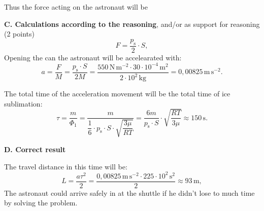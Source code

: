 Thus the force acting on the astronaut will be

\textbf{C. Calculations according to the reasoning}, and/or as support for
reasoning \hfill(2 points)
\[ F = \frac{p_{\mathrm{s}}}{2}\cdot S, \]
Opening the can the astronaut will be accelearated %
with:
\[ a = \frac{F}{M} = \frac{p_{\mathrm{s}}\cdot S}{2M}
   = \frac{550\,\mathrm{N\,m^{-2}} \cdot 30\cdot10^{-4}\,\mathrm{m^2}}
          {2\cdot10^{2}\,\mathrm{kg}}
   = 0{,}00825\,\mathrm{m\,s^{-2}}. \]

The total time of the acceleration movement will be the total time of ice
sublimation:
\[ \tau = \frac{m}{\Phi_1}
   = \frac{m}{\dfrac{1}{6}\cdot p_{\mathrm{s}}\cdot S
     \cdot\sqrt{\dfrac{3\mu}{RT}}}
   = \frac{6m}{p_{\mathrm{s}}\cdot S}\cdot\sqrt{\frac{RT}{3\mu}}
   \approx 150\,\mathrm{s}. \]

\textbf{D. Correct result}

The travel distance in this time will be:
\[ L = \frac{a\tau^2}{2}
   = \frac{0{,}00825\,\mathrm{m\,s^{-2}} \cdot 225\cdot10^{2}\,\mathrm{s^2}}{2}
   \approx 93\,\mathrm{m}, \]
The astronaut could arrive safely in at the shuttle if he didn't lose to much
time by solving the problem. %
